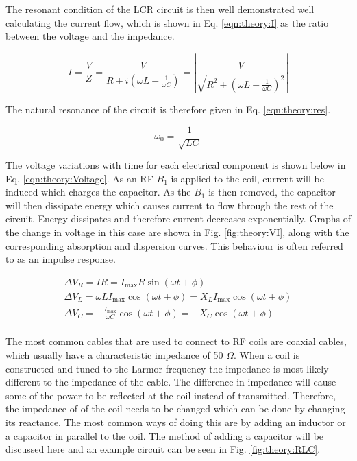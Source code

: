The resonant condition of the LCR circuit is then well demonstrated well calculating the current flow, which is shown in Eq. \ref{eqn:theory:I} as the ratio between the voltage and the impedance.

\begin{equation}
    I = \frac{V}{Z} = \frac{V}{R+i(\omega L - \frac{1}{\omega C})} = \left| \frac{V}{\sqrt{R^2+(\omega L - \frac{1}{\omega C})^2}} \right|
    \label{eqn:theory:I}
\end{equation}

The natural resonance of the circuit is therefore given in Eq. \ref{eqn:theory:res}.

\begin{equation}
    \omega_0 = \frac{1}{\sqrt{LC}}
    \label{eqn:theory:res}
\end{equation}

The voltage variations with time for each electrical component is shown below in Eq. \ref{eqn:theory:Voltage}. As an \ac{RF} $B_1$ is applied to the coil, current will be induced which charges the capacitor. As the $B_1$ is then removed, the capacitor will then dissipate energy which causes current to flow through the rest of the circuit. Energy dissipates and therefore current decreases exponentially. Graphs of the change in voltage in this case are shown in Fig. \ref{fig:theory:VI}, along with the corresponding absorption and dispersion curves. This behaviour is often referred to as an impulse response.

\begin{equation}
\begin{gathered}
    \Delta V_R = IR = I_{\mathrm{max}}R\sin(\omega t + \phi) \\
    \Delta V_L = \omega LI_{\mathrm{max}}\cos(\omega t + \phi) =  X_LI_{\mathrm{max}}\cos(\omega t + \phi)\\
    \Delta V_C = -\frac{I_{\mathrm{max}}}{\omega C}\cos(\omega t + \phi) = -X_C\cos(\omega t + \phi)\\
    \label{eqn:theory:Voltage}
\end{gathered}
\end{equation}

The most common cables that are used to connect to \ac{RF} coils are coaxial cables, which usually have a characteristic impedance of 50 $\Omega$. When a coil is constructed and tuned to the Larmor frequency the impedance is most likely different to the impedance of the cable. The difference in impedance will cause some of the power to be reflected at the coil instead of transmitted. Therefore, the impedance of of the coil needs to be changed which can be done by changing its reactance. The most common ways of doing this are by adding an inductor or a capacitor in parallel to the coil. The method of adding a capacitor will be discussed here and an example circuit can be seen in Fig. \ref{fig:theory:RLC}.

